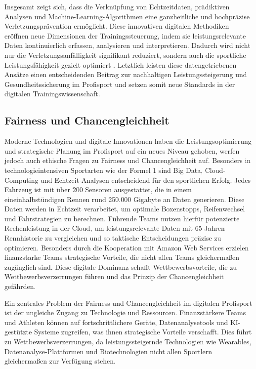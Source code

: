\documentclass[
  number]{elsarticle}
\begin{document}
Insgesamt zeigt sich, dass die Verknüpfung von Echtzeitdaten,
prädiktiven Analysen und Machine-Learning-Algorithmen eine ganzheitliche
und hochpräzise Verletzungsprävention ermöglicht. Diese innovativen
digitalen Methodiken eröffnen neue Dimensionen der Trainingssteuerung,
indem sie leistungsrelevante Daten kontinuierlich erfassen, analysieren
und interpretieren. Dadurch wird nicht nur die Verletzungsanfälligkeit
signifikant reduziert, sondern auch die sportliche Leistungsfähigkeit
gezielt optimiert
\citetext{\citealp[pp.~117-119]{memmert_sportinformatik}; \citealp{rossi_injuryforecasting}}.
Letztlich leisten diese datengetriebenen Ansätze einen entscheidenden
Beitrag zur nachhaltigen Leistungssteigerung und Gesundheitssicherung im
Profisport und setzen somit neue Standards in der digitalen
Trainingswissenschaft.

\subsection{Fairness und
Chancengleichheit}\label{fairness-und-chancengleichheit}

Moderne Technologien und digitale Innovationen haben die
Leistungsoptimierung und strategische Planung im Profisport auf ein
neues Niveau gehoben, werfen jedoch auch ethische Fragen zu Fairness und
Chancengleichheit auf. Besonders in technologieintensiven Sportarten wie
der Formel 1 sind Big Data, Cloud-Computing und Echtzeit-Analysen
entscheidend für den sportlichen Erfolg. Jedes Fahrzeug ist mit über 200
Sensoren ausgestattet, die in einem eineinhalbstündigen Rennen rund
250.000 Gigabyte an Daten generieren. Diese Daten werden in Echtzeit
verarbeitet, um optimale Boxenstopps, Reifenwechsel und Fahrstrategien
zu berechnen. Führende Teams nutzen hierfür potenzierte Rechenleistung
in der Cloud, um leistungsrelevante Daten mit 65 Jahren Rennhistorie zu
vergleichen und so taktische Entscheidungen präzise zu optimieren.
Besonders durch die Kooperation mit Amazon Web Services erzielen
finanzstarke Teams strategische Vorteile, die nicht allen Teams
gleichermaßen zugänglich sind. Diese digitale Dominanz schafft
Wettbewerbsvorteile, die zu Wettbewerbsverzerrungen führen und das
Prinzip der Chancengleichheit gefährden. \citep{kleinezeitung_f1daten}

Ein zentrales Problem der Fairness und Chancengleichheit im digitalen
Profisport ist der ungleiche Zugang zu Technologie und Ressourcen.
Finanzstärkere Teams und Athleten können auf fortschrittlichere Geräte,
Datenanalysetools und KI-gestützte Systeme zugreifen, was ihnen
strategische Vorteile verschafft. Dies führt zu Wettbewerbsverzerrungen,
da leistungssteigernde Technologien wie Wearables,
Datenanalyse-Plattformen und Biotechnologien nicht allen Sportlern
gleichermaßen zur Verfügung stehen. \citep[p.~4]{laukyte_disruptivetech}
\end{document}
